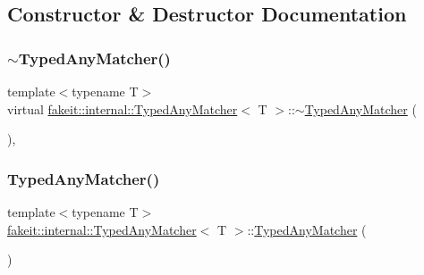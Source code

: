 \subsection{Constructor \& Destructor Documentation}
\mbox{\label{structfakeit_1_1internal_1_1TypedAnyMatcher_a52af9fb206f668d7cfe238758132a531}} 
\subsubsection{\texorpdfstring{$\sim$TypedAnyMatcher()}{~TypedAnyMatcher()}\hspace{0.1cm}{\footnotesize\ttfamily [1/9]}}
{\footnotesize\ttfamily template$<$typename T$>$ \\
virtual \mbox{\hyperlink{structfakeit_1_1internal_1_1TypedAnyMatcher}{fakeit\+::internal\+::\+Typed\+Any\+Matcher}}$<$ T $>$\+::$\sim$\mbox{\hyperlink{structfakeit_1_1internal_1_1TypedAnyMatcher}{Typed\+Any\+Matcher}} (\begin{DoxyParamCaption}{ }\end{DoxyParamCaption})\hspace{0.3cm}{\ttfamily [virtual]}, {\ttfamily [default]}}

\mbox{\label{structfakeit_1_1internal_1_1TypedAnyMatcher_a8b569fe8bfe34ad8e9a893ebc13cea52}} 
\subsubsection{\texorpdfstring{TypedAnyMatcher()}{TypedAnyMatcher()}\hspace{0.1cm}{\footnotesize\ttfamily [1/9]}}
{\footnotesize\ttfamily template$<$typename T$>$ \\
\mbox{\hyperlink{structfakeit_1_1internal_1_1TypedAnyMatcher}{fakeit\+::internal\+::\+Typed\+Any\+Matcher}}$<$ T $>$\+::\mbox{\hyperlink{structfakeit_1_1internal_1_1TypedAnyMatcher}{Typed\+Any\+Matcher}} (\begin{DoxyParamCaption}{ }\end{DoxyParamCaption})\hspace{0.3cm}{\ttfamily [inline]}}

